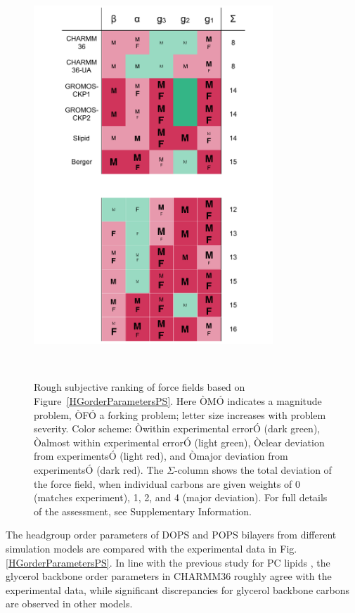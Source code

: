 \documentclass[aps,prl,superscriptaddress,twocolumn]{revtex4}
\begin{document}
\begin{figure}[]
  \centering
  \includegraphics[width=9.0cm]{../Figs/comparisonTablePS.pdf}
  \caption{\label{comparisonTablePS}
  Rough subjective ranking of force fields based on Figure~\ref{HGorderParametersPS}. Here ÒMÓ indicates a magnitude problem, ÒFÓ a forking problem; letter size increases with problem severity. Color scheme: Òwithin experimental errorÓ (dark green), Òalmost within experimental errorÓ (light green), Òclear deviation from experimentsÓ (light red), and Òmajor deviation from experimentsÓ (dark red). The $\Sigma$-column shows the total deviation of the force field, when individual carbons are given weights of 0 (matches experiment), 1, 2, and 4 (major deviation). For full details of the assessment, see Supplementary Information.
  }
   \\
\end{figure}

The headgroup order parameters of DOPS and POPS bilayers 
from different simulation models are compared with the experimental
data in Fig. \ref{HGorderParametersPS}. In line with the previous
study for PC lipids \cite{botan15}, the glycerol backbone order 
parameters in CHARMM36 roughly agree with the experimental data,
while significant discrepancies for glycerol backbone carbons
are observed in other models.
 \\
\end{document}
